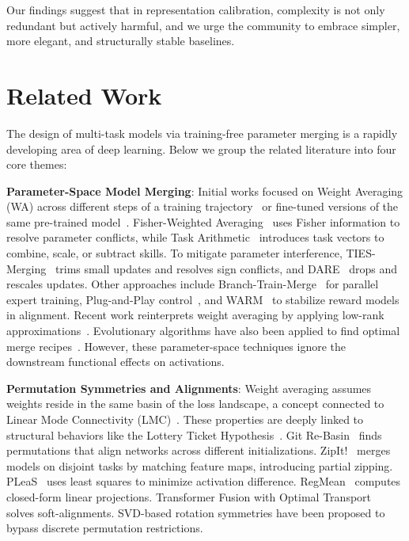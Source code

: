 \documentclass{article}
\theoremstyle{plain}
\theoremstyle{definition}
\theoremstyle{remark}
\begin{document}
Our findings suggest that in representation calibration, complexity is not only redundant but actively harmful, and we urge the community to embrace simpler, more elegant, and structurally stable baselines.

\section{Related Work}
\label{sec:related_work}

The design of multi-task models via training-free parameter merging is a rapidly developing area of deep learning. Below we group the related literature into four core themes:

\textbf{Parameter-Space Model Merging}: Initial works focused on Weight Averaging (WA) across different steps of a training trajectory~\cite{izmailov2018averaging, kaddour2022latest} or fine-tuned versions of the same pre-trained model~\cite{wortsman2022model}. Fisher-Weighted Averaging~\cite{matena2022merging} uses Fisher information to resolve parameter conflicts, while Task Arithmetic~\cite{ilharco2022editing, ortiz2023task} introduces task vectors to combine, scale, or subtract skills. To mitigate parameter interference, TIES-Merging~\cite{yadav2023ties} trims small updates and resolves sign conflicts, and DARE~\cite{yu2024dare} drops and rescales updates. Other approaches include Branch-Train-Merge~\cite{li2022branch} for parallel expert training, Plug-and-Play control~\cite{dathathri2019plug}, and WARM~\cite{rame2024warm} to stabilize reward models in alignment. Recent work reinterprets weight averaging by applying low-rank approximations~\cite{choi2024revisiting}. Evolutionary algorithms have also been applied to find optimal merge recipes~\cite{akiba2024evolutionary}. However, these parameter-space techniques ignore the downstream functional effects on activations.

\textbf{Permutation Symmetries and Alignments}: Weight averaging assumes weights reside in the same basin of the loss landscape, a concept connected to Linear Mode Connectivity (LMC)~\cite{entezari2021role, luan2019geometry, li2018visualizing}. These properties are deeply linked to structural behaviors like the Lottery Ticket Hypothesis~\cite{frankle2018lottery}. Git Re-Basin~\cite{ainsworth2022git} finds permutations that align networks across different initializations. ZipIt!~\cite{stoica2023zipit} merges models on disjoint tasks by matching feature maps, introducing partial zipping. PLeaS~\cite{nasery2024pleas} uses least squares to minimize activation difference. RegMean~\cite{jin2022dataless} computes closed-form linear projections. Transformer Fusion with Optimal Transport~\cite{imfeld2024transformer} solves soft-alignments. SVD-based rotation symmetries have been proposed to bypass discrete permutation restrictions.
\end{document}
